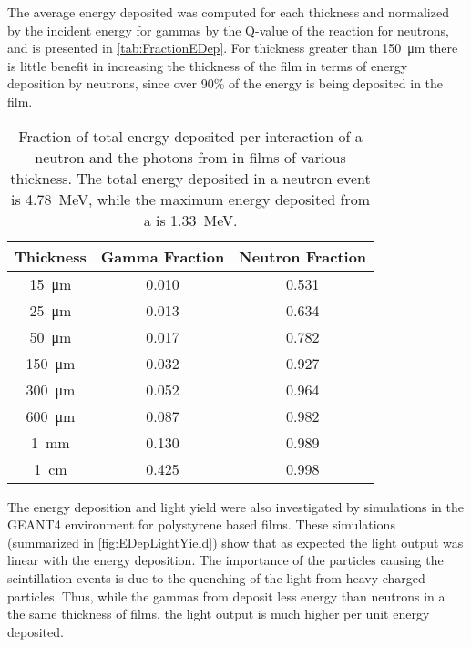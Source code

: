 The average energy deposited was computed for each thickness and normalized by the incident energy for gammas by the Q-value of the reaction for neutrons, and is presented in \autoref{tab:FractionEDep}.
For thickness greater than \SI{150}{\um} there is little benefit in increasing the thickness of the film in terms of energy deposition by neutrons, since over 90\% of the energy is being deposited in the film.
\begin{table}
    \caption[Fractional Energy Deposition per Interaction for Various Thickness]{Fraction of total energy deposited per interaction of a neutron and the photons from  in films of various thickness. The total energy deposited in a neutron event is \SI{4.78}{\MeV}, while the maximum energy deposited from a  is \SI{1.33}{\MeV}.\EnergyDepSimGeo}
      \label{tab:FractionEDep}
	\centering
	\begin{tabular}{c | c c}
\toprule
	Thickness & Gamma Fraction & Neutron Fraction \\
\midrule
	\SI{15}{\um} & 0.010 & 0.531 \\
	\SI{25}{\um} & 0.013 & 0.634 \\
	\SI{50}{\um} & 0.017 & 0.782 \\
	\SI{150}{\um} & 0.032 & 0.927 \\
	\SI{300}{\um} & 0.052 & 0.964 \\
	\SI{600}{\um} & 0.087 & 0.982 \\
	\SI{1}{\mm} & 0.130 & 0.989 \\
	\SI{1}{\cm} & 0.425 & 0.998 \\
\bottomrule
	\end{tabular}
\end{table}
The energy deposition and light yield were also investigated by simulations in the GEANT4 environment for polystyrene based films.
These simulations (summarized in \autoref{fig:EDepLightYield}) show that as expected the light output was linear with the energy deposition.
The importance of the particles causing the scintillation events is due to the quenching of the light from heavy charged particles.
Thus, while the gammas from  deposit  less energy than neutrons in a the same thickness of films, the light output is much higher per unit energy deposited.
